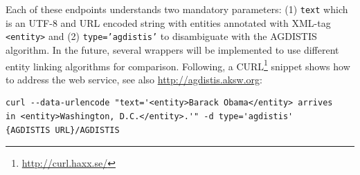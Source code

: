 Each of these endpoints understands two mandatory parameters: (1) \texttt{text} which is an UTF-8 and URL encoded string with entities annotated with XML-tag \texttt{<entity>} and (2) \texttt{type='agdistis'} to disambiguate with the AGDISTIS algorithm.
In the future, several wrappers will be implemented to use different entity linking algorithms for comparison.
Following, a CURL\footnote{\url{http://curl.haxx.se/}} snippet shows how to address the web service, see also \url{http://agdistis.aksw.org}:
\begin{verbatim}
curl --data-urlencode "text='<entity>Barack Obama</entity> arrives 
in <entity>Washington, D.C.</entity>.'" -d type='agdistis' 
{AGDISTIS URL}/AGDISTIS
\end{verbatim}


